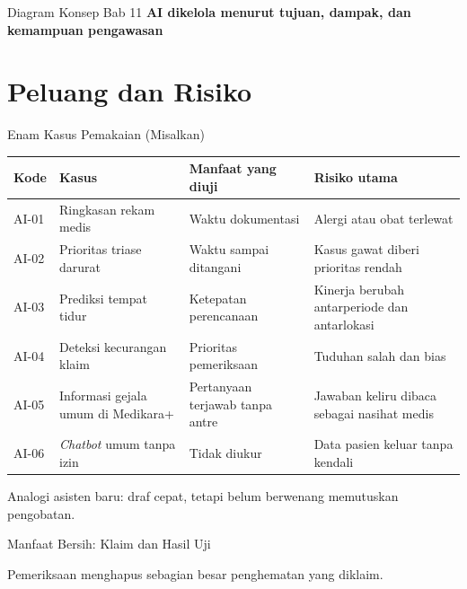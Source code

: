 \documentclass[aspectratio=169, table, 12pt]{beamer}
\begin{document}
\begin{frame}{{\Large Diagram Konsep Bab 11}}
  \centering
  {\small\bfseries AI dikelola menurut tujuan, dampak, dan kemampuan pengawasan}\par\medskip
  \label{fig:session11-ilustrasi-bab}
\end{frame}

\section{Peluang dan Risiko}

\begin{frame}{{\Large Enam Kasus Pemakaian (Misalkan)}}
  \vspace{2pt}
  \scriptsize
  \begin{tabularx}{\textwidth}{|>{\raggedright\arraybackslash}p{}|>{\raggedright\arraybackslash}X|>{\raggedright\arraybackslash}X|>{\raggedright\arraybackslash}X|}
    \hline
    \textbf{Kode} & \textbf{Kasus} & \textbf{Manfaat yang diuji} & \textbf{Risiko utama} \\ \hline
    AI-01 & Ringkasan rekam medis & Waktu dokumentasi & Alergi atau obat terlewat \\ \hline
    AI-02 & Prioritas triase darurat & Waktu sampai ditangani & Kasus gawat diberi prioritas
    rendah \\ \hline
    AI-03 & Prediksi tempat tidur & Ketepatan perencanaan & Kinerja berubah antarperiode dan
    antarlokasi \\ \hline
    AI-04 & Deteksi kecurangan klaim & Prioritas pemeriksaan & Tuduhan salah dan bias \\ \hline
    AI-05 & Informasi gejala umum di Medikara+ & Pertanyaan terjawab tanpa antre & Jawaban keliru
    dibaca sebagai nasihat medis \\ \hline
    AI-06 & \textit{Chatbot} umum tanpa izin & Tidak diukur & Data pasien keluar tanpa kendali \\
    \hline
  \end{tabularx}

  \vspace{6pt}
  \small Analogi asisten baru: draf cepat, tetapi belum berwenang memutuskan pengobatan.
\end{frame}

\begin{frame}{{\Large Manfaat Bersih: Klaim dan Hasil Uji}}
  \vspace{4pt}
  \begin{center}
    \resizebox{0.92\textwidth}{!}{}
  \end{center}
  \small Pemeriksaan menghapus sebagian besar penghematan yang diklaim.
\end{frame}
\end{document}
